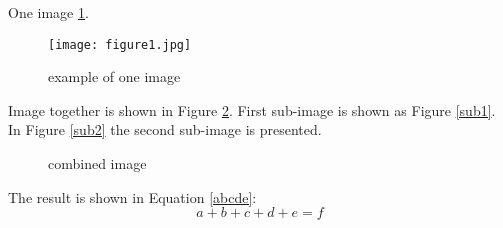 \documentclass{article}
\begin{document}
One image \ref{one-img}.
\begin{figure}[!htbp]
\centering
\texttt{[image: figure1.jpg]}
\caption{example of one image} \label{one-img}
\end{figure}

Image together is shown in Figure \ref{img-together}.
First sub-image is shown as Figure \ref{sub1}.
In Figure \ref{sub2} the second sub-image is presented.
\begin{figure}[!htbp]
\centering
{}
\qquad
{}
\caption{combined image}\label{img-together}
\end{figure}

The result is shown in Equation \ref{abcde}:
\begin{equation}\label{abcde}
a+b+c+d+e=f
\end{equation}
\end{document}
